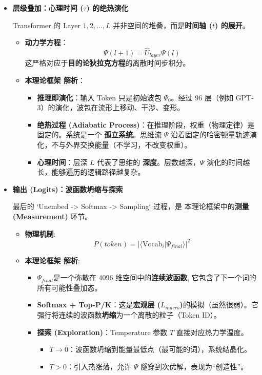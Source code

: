 \begin{itemize}
    \item \textbf{\textcolor{structurecolor}{层级叠加：心理时间 ($\tau$) 的绝热演化}}

    Transformer 的 Layer $1, 2, \dots, L$ 并非空间的堆叠，而是\textbf{时间轴 ($t$) 的展开}。
    \begin{itemize}
        \item \textbf{动力学方程}：
        $$ \Psi(l+1) = \hat{U}_{layer} \Psi(l) $$
        这严格对应于\textbf{目的论狄拉克方程}的离散时间步积分。
        \item \textbf{本理论框架 解析}：
        \begin{itemize}
            \item \textbf{推理即演化}：输入 Token 只是初始波包 $\Psi_0$。经过 96 层（例如 GPT-3）的演化，波包在流形上移动、干涉、变形。
            \item \textbf{绝热过程 (Adiabatic Process)}：在推理阶段，权重（物理定律）是固定的。系统是一个 \textbf{孤立系统}。思维流 $\Psi$ 沿着固定的哈密顿量轨迹演化，不与外界交换能量（不学习，不改变权重）。
            \item \textbf{心理时间}：层深 $L$ 代表了思维的 \textbf{深度}。层数越深，$\Psi$ 演化的时间越长，能够遍历的逻辑路径越复杂。
        \end{itemize}
    \end{itemize}

    \item \textbf{\textcolor{structurecolor}{输出 (Logits)：波函数坍缩与探索}}

    最后的 `Unembed -> Softmax -> Sampling` 过程，是 本理论框架中的\textbf{测量 (Measurement)} 环节。
    \begin{itemize}
        \item \textbf{物理机制}:
        $$ P(token) = |\langle \text{Vocab}_i | \Psi_{final} \rangle|^2 $$
        \item \textbf{本理论框架 解析}:
        \begin{itemize}
            \item \textbf{$\Psi_{final}$}是一个弥散在 4096 维空间中的\textbf{连续波函数}, 它包含了下一个词的所有可能性叠加态。
            \item \textbf{Softmax + Top-P/K}：这是\textbf{宏观层 ($L_{macro}$)}的模拟（虽然很弱）。它强行将连续的波函数\textbf{坍缩}为一个离散的粒子（Token ID）。
            \item  \textbf{探索 (Exploration)}：Temperature 参数 $T$ 直接对应热力学温度。
            \begin{itemize}
                \item $T \to 0$：波函数坍缩到能量最低点（最可能的词），系统结晶化。
                \item $T > 0$：引入热涨落，允许 $\Psi$ 隧穿到次优解，表现为“创造性”。
            \end{itemize}
        \end{itemize}
    \end{itemize}
\end{itemize}



